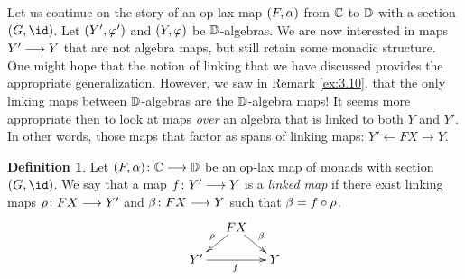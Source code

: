 \documentclass{amsart}
\theoremstyle{definition}
\newtheorem{defn}[thm]{Definition}
\newtheorem{exmp}[thm]{Example}
\begin{document}
Let us continue on the story of an op-lax map $(F,\alpha)$ from $\mathbb{C}$ to $\mathbb{D}$ with a section $(G,\id)$. Let $(Y',\varphi')$ and $(Y,\varphi)$ be $\mathbb{D}$-algebras. We are now interested in maps $Y' \longrightarrow Y$ 
that are not algebra maps, but still retain some monadic structure. One might hope that the notion of linking that we have discussed provides the appropriate generalization. However, we saw in Remark \ref{ex:3.10},
that the only linking maps between $\mathbb{D}$-algebras are the $\mathbb{D}$-algebra maps! It seems more appropriate then to look at maps \emph{over} an algebra that is linked to both $Y$ and $Y'$. In other words, those maps that factor as spans of linking maps: $Y' \leftarrow FX \rightarrow Y$.
\begin{defn}\label{def:linked}
    Let $(F,\alpha) \colon \mathbb{C} \longrightarrow \mathbb{D}$ be an op-lax map of monads with section $(G,\id)$. We say that a map 
    $f \colon Y' \longrightarrow Y$ is a \emph{linked map} if there exist linking maps $\rho \colon FX \longrightarrow Y'$ and 
    $\beta \colon FX \longrightarrow Y$ such that $\beta = f \circ \rho$.
    \[
    \xymatrix@-1pc{
        & FX \ar[dl]_-{\rho} \ar[dr]^{\be} &\\
        Y' \ar[rr]_{f} && Y
    }
    \]
\end{defn}

\end{document}
